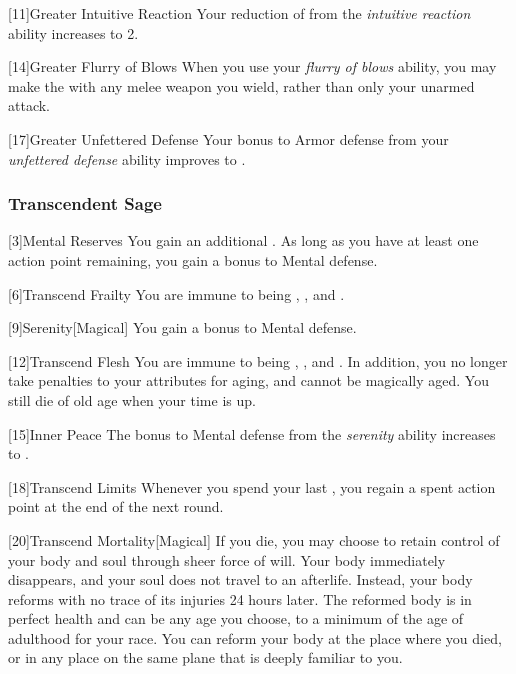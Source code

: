             [11]{Greater Intuitive Reaction}
            Your reduction of  from the \textit{intuitive reaction} ability increases to 2.

            [14]{Greater Flurry of Blows}
            When you use your \textit{flurry of blows} ability, you may make the  with any melee weapon you wield, rather than only your unarmed attack.

            [17]{Greater Unfettered Defense}
            Your bonus to Armor defense from your \textit{unfettered defense} ability improves to .

        \subsubsection{Transcendent Sage}
            [3]{Mental Reserves} You gain an additional .
            As long as you have at least one action point remaining, you gain a  bonus to Mental defense.

            [6]{Transcend Frailty}
            You are immune to being , , and .

            [9]{Serenity}[Magical]
            You gain a  bonus to Mental defense.

            [12]{Transcend Flesh}
            You are immune to being , , and .
            In addition, you no longer take penalties to your attributes for aging, and cannot be magically aged.
            You still die of old age when your time is up.

            [15]{Inner Peace}
            The bonus to Mental defense from the \textit{serenity} ability increases to .

            [18]{Transcend Limits}
            Whenever you spend your last , you regain a spent action point at the end of the next round.

            [20]{Transcend Mortality}[Magical]
            If you die, you may choose to retain control of your body and soul through sheer force of will.
            Your body immediately disappears, and your soul does not travel to an afterlife.
            Instead, your body reforms with no trace of its injuries 24 hours later.
            The reformed body is in perfect health and can be any age you choose, to a minimum of the age of adulthood for your race.
            You can reform your body at the place where you died, or in any place on the same plane that is deeply familiar to you.

